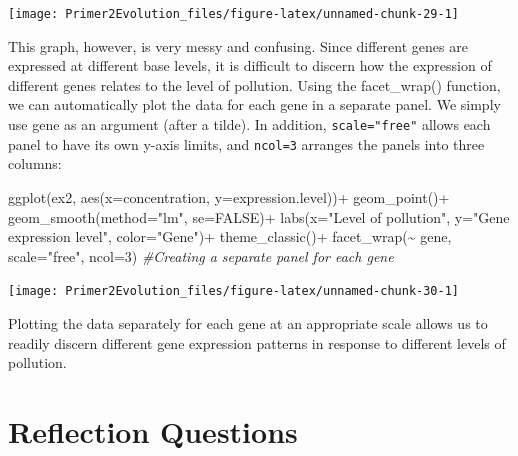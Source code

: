 \documentclass[
]{book}
\newenvironment{Shaded}{\begin{snugshade}}{\end{snugshade}}
\newcommand{\AttributeTok}[1]{\textcolor[rgb]{0.77,0.63,0.00}{#1}}
\newcommand{\CommentTok}[1]{\textcolor[rgb]{0.56,0.35,0.01}{\textit{#1}}}
\newcommand{\ConstantTok}[1]{\textcolor[rgb]{0.00,0.00,0.00}{#1}}
\newcommand{\DecValTok}[1]{\textcolor[rgb]{0.00,0.00,0.81}{#1}}
\newcommand{\FunctionTok}[1]{\textcolor[rgb]{0.00,0.00,0.00}{#1}}
\newcommand{\NormalTok}[1]{#1}
\newcommand{\SpecialCharTok}[1]{\textcolor[rgb]{0.00,0.00,0.00}{#1}}
\newcommand{\StringTok}[1]{\textcolor[rgb]{0.31,0.60,0.02}{#1}}
\begin{document}
\texttt{[image: Primer2Evolution\_files/figure-latex/unnamed-chunk-29-1]}

This graph, however, is very messy and confusing. Since different genes are expressed at different base levels, it is difficult to discern how the expression of different genes relates to the level of pollution. Using the facet\_wrap() function, we can automatically plot the data for each gene in a separate panel. We simply use gene as an argument (after a tilde). In addition, \texttt{scale="free"} allows each panel to have its own y-axis limits, and \texttt{ncol=3} arranges the panels into three columns:

\begin{Shaded}
\begin{Highlighting}[]
\FunctionTok{ggplot}\NormalTok{(ex2, }\FunctionTok{aes}\NormalTok{(}\AttributeTok{x=}\NormalTok{concentration, }\AttributeTok{y=}\NormalTok{expression.level))}\SpecialCharTok{+}
    \FunctionTok{geom\_point}\NormalTok{()}\SpecialCharTok{+}
    \FunctionTok{geom\_smooth}\NormalTok{(}\AttributeTok{method=}\StringTok{"lm"}\NormalTok{, }\AttributeTok{se=}\ConstantTok{FALSE}\NormalTok{)}\SpecialCharTok{+}
    \FunctionTok{labs}\NormalTok{(}\AttributeTok{x=}\StringTok{"Level of pollution"}\NormalTok{, }\AttributeTok{y=}\StringTok{"Gene expression level"}\NormalTok{, }\AttributeTok{color=}\StringTok{"Gene"}\NormalTok{)}\SpecialCharTok{+}
    \FunctionTok{theme\_classic}\NormalTok{()}\SpecialCharTok{+}
    \FunctionTok{facet\_wrap}\NormalTok{(}\SpecialCharTok{\textasciitilde{}}\NormalTok{ gene, }\AttributeTok{scale=}\StringTok{"free"}\NormalTok{, }\AttributeTok{ncol=}\DecValTok{3}\NormalTok{) }\CommentTok{\#Creating a separate panel for each gene}
\end{Highlighting}
\end{Shaded}

\texttt{[image: Primer2Evolution\_files/figure-latex/unnamed-chunk-30-1]}

Plotting the data separately for each gene at an appropriate scale allows us to readily discern different gene expression patterns in response to different levels of pollution.

\hypertarget{reflection-questions-8}{%
\section{Reflection Questions}\label{reflection-questions-8}}
\end{document}
